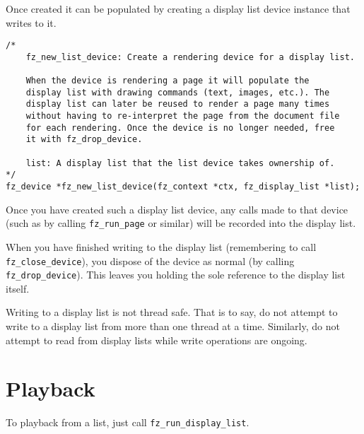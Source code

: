 \documentclass[oneside]{book}
\begin{document}
Once created it can be populated by creating a display list device instance that writes to it.

\begin{lstlisting}
/*
	fz_new_list_device: Create a rendering device for a display list.

	When the device is rendering a page it will populate the
	display list with drawing commands (text, images, etc.). The
	display list can later be reused to render a page many times
	without having to re-interpret the page from the document file
	for each rendering. Once the device is no longer needed, free
	it with fz_drop_device.

	list: A display list that the list device takes ownership of.
*/
fz_device *fz_new_list_device(fz_context *ctx, fz_display_list *list);
\end{lstlisting}

Once you have created such a display list device, any calls made to that device (such as by calling \texttt{fz\_run\_page} or similar) will be recorded into the display list.

When you have finished writing to the display list (remembering to call \texttt{fz\_close\_device}), you dispose of the device as normal (by calling \texttt{fz\_drop\_device}). This leaves you holding the sole reference to the display list itself.

Writing to a display list is not thread safe. That is to say, do not attempt to write to a display list from more than one thread at a time. Similarly, do not attempt to read from display lists while write operations are ongoing.

\section{Playback}

To playback from a list, just call \texttt{fz\_run\_display\_list}.
\end{document}
